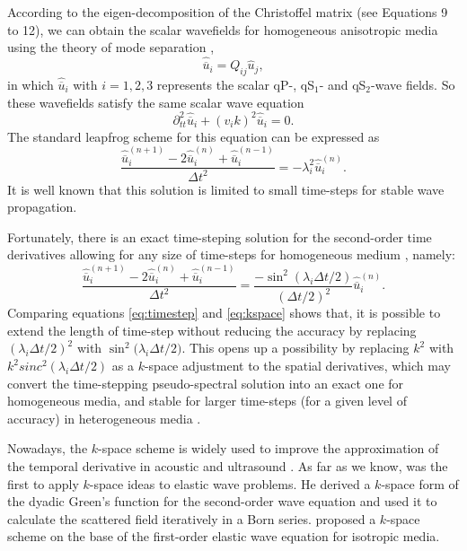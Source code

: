 According to the eigen-decomposition of the Christoffel matrix (see Equations 9 to 12), we can obtain the scalar
wavefields for homogeneous anisotropic media using the theory of mode separation \cite []{dellinger.etgen:1990},
\begin{equation}
\label{eq:timestep}
\hat{\overline{u}}_i = Q_{ij}\hat{u}_j,
\end{equation}
in which $\hat{\overline{u}}_i$ with $i=1, 2,3$ represents the scalar qP-, qS$_1$- and
qS$_2$-wave fields.
So these wavefields satisfy the same scalar wave equation
\begin{equation}
\label{eq:scalarh}
\partial^2_{tt}\hat{\overline{u}}_i + (v_i{k})^2\hat{\overline{u}}_i = 0.
\end{equation}
The standard leapfrog scheme for this equation can be expressed as
\begin{equation}
\label{eq:timestep}
\frac{\hat{\overline{u}}^{(n+1)}_i - 2\hat{\overline{u}}^{(n)}_i +
\hat{\overline{u}}^{(n-1)}_i}{\Delta{t}^2} = -\lambda^2_i\hat{\overline{u}}^{(n)}_i.
\end{equation}
It is well known that this solution is limited to small time-steps for stable wave
propagation.

Fortunately, there is an exact time-steping solution  
for the second-order time derivatives allowing for any size of time-steps 
for homogeneous medium \cite[]{cox:2007,etgen:2009}, namely:
\begin{equation}
\label{eq:kspace}
\frac{\hat{\overline{u}}^{(n+1)}_i - 2\hat{\overline{u}}^{(n)}_i +
\hat{\overline{u}}^{(n-1)}_i}{\Delta{t}^2} =
\frac{-\sin^2(\lambda_i\Delta{t}/2)}{(\Delta{t}/2)^2}\hat{\overline{u}}^{(n)}_i.
\end{equation}
Comparing equations \ref{eq:timestep} and \ref{eq:kspace} shows that, it is possible
to extend the length of time-step without reducing the
accuracy by replacing $(\lambda_i\Delta{t}/2)^2$ with $\sin^2{(\lambda_i\Delta{t}/2})$.
This opens up a possibility by replacing $k^2$ with
$k^2{sinc^2(\lambda_i\Delta{t}/2)}$ as
a $k$-space adjustment to the spatial derivatives, which may convert the time-stepping
pseudo-spectral solution into an exact one for homogeneous media, and stable for larger
time-steps (for a given level of accuracy) in heterogeneous media
\cite[]{bojarski:1982}.

Nowadays, the $k$-space scheme is widely used to improve the approximation of the temporal
derivative in acoustic and ultrasound \cite[]{tabei:2002,cox:2007,fang.fomel:2014}.
As far as we know, \cite{liu:1995} was the first to apply $k$-space ideas to elastic wave problems. He
derived a $k$-space form of the dyadic Green's function for the
second-order wave equation and used it to calculate the scattered field
iteratively in a Born series. \cite{firouzi:2012} proposed a 
$k$-space scheme on the base of the first-order elastic wave equation for isotropic media.

